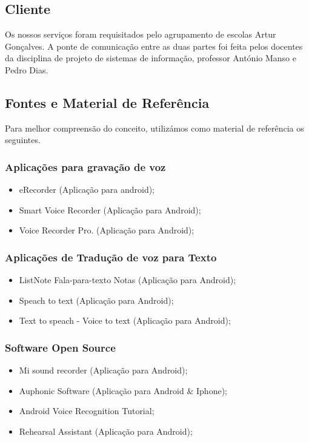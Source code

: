 \documentclass[a4paper,titlepage]{article}
\begin{document}
		\newpage
		\subsection{Cliente}
				Os nossos serviços foram requisitados pelo agrupamento de escolas Artur Gonçalves. A ponte de comunicação entre as duas partes foi feita pelos docentes da disciplina de projeto de sistemas de informação, professor António Manso e Pedro Dias. 
				
				\subsection{Fontes e Material de Referência}
				Para melhor compreensão do conceito, utilizámos como material de referência os seguintes.
				\subsubsection{Aplicações para gravação de voz} 
					\begin{itemize}
						\item eRecorder (Aplicação para android);
						\item Smart Voice Recorder (Aplicação para Android);
						\item Voice Recorder Pro. (Aplicação para Android);		
					\end{itemize} 
				\subsubsection{Aplicações de Tradução de voz para Texto}
					\begin{itemize}
						\item ListNote Fala-para-texto Notas (Aplicação para Android); 
						\item Speach to text (Aplicação para Android);
						\item Text to speach - Voice to text (Aplicação para Android);
					\end{itemize}
				\subsubsection{Software Open Source}
					\begin{itemize}
						\item Mi sound recorder (Aplicação para Android);
						\item Auphonic Software (Aplicação para Android \& Iphone);
						\item Android Voice Recognition Tutorial;
						\item Rehearsal Assistant (Aplicação para Android);
					\end{itemize}
				
\end{document}
